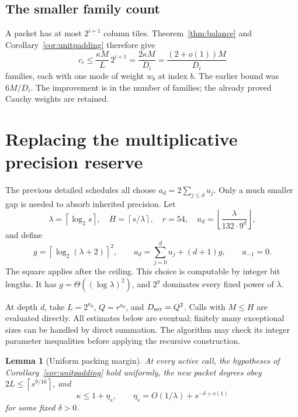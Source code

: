 \documentclass[11pt,letterpaper]{article}
\numberwithin{equation}{section}
\newtheorem{lemma}[theorem]{Lemma}
\theoremstyle{definition}\newtheorem{definition}[theorem]{Definition}
\theoremstyle{remark}\newtheorem{remark}[theorem]{Remark}
\newcommand{\ceil}[1]{\left\lceil #1\right\rceil}
\newcommand{\floor}[1]{\left\lfloor #1\right\rfloor}
\begin{document}
\subsection{The smaller family count}

A packet has at most $2^{i+1}$ column tiles. Theorem~\ref{thm:balance} and Corollary~\ref{cor:unitpadding} therefore give
\begin{equation}\label{eq:families}
 c_i\le\frac{\kappa M}{L}\,2^{i+1}
      =\frac{2\kappa M}{D_i}
      =\frac{(2+o(1))M}{D_i}
\end{equation}
families, each with one mode of weight $w_b$ at index $b$. The earlier bound was $6M/D_i$. The improvement is in the number of families; the already proved Cauchy weights are retained.

\section{Replacing the multiplicative precision reserve}
\label{sec:guard}

The previous detailed schedules all choose $a_d=2\sum_{j\le d}u_j$. Only a much smaller gap is needed to absorb inherited precision. Let
\begin{equation}\label{eq:parameters}
 \lambda=\ceil{\log_2s},\quad
 H=\ceil{s/\lambda},\quad r=54,\quad
 u_d=\floor{\frac{\lambda}{132\cdot9^d}},
\end{equation}
and define
\begin{equation}\label{eq:guard}
 g=\ceil{\log_2(\lambda+2)}^{\!2},\qquad
 a_d=\sum_{j=0}^d u_j+(d+1)g,\qquad a_{-1}=0.
\end{equation}
The square applies after the ceiling. This choice is computable by integer bit lengths. It has $g=\Theta((\log\lambda)^2)$, and $2^g$ dominates every fixed power of $\lambda$.

At depth $d$, take $L=2^{a_d}$, $Q=r^{a_d}$, and $D_{\rm arr}=Q^2$. Calls with $M\le H$ are evaluated directly. All estimates below are eventual; finitely many exceptional sizes can be handled by direct summation. The algorithm may check its integer parameter inequalities before applying the recursive construction.

\begin{lemma}[Uniform packing margin]\label{lem:margin}
At every active call, the hypotheses of Corollary~\ref{cor:unitpadding} hold uniformly, the new packet degrees obey $2L\le\ceil{s^{9/10}}$, and
\begin{equation}\label{eq:kappa-uniform}
 \kappa\le1+\eta_s,\qquad
 \eta_s=O(1/\lambda)+s^{-\delta+o(1)}
\end{equation}
for some fixed $\delta>0$.
\end{lemma}
\end{document}
